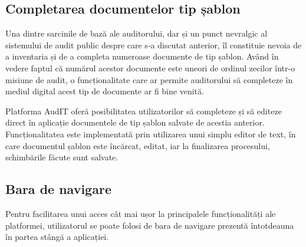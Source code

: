  
 \subsection{Completarea documentelor tip șablon}
 
	Una dintre sarcinile de bază ale auditorului, dar și un punct nevralgic al sistemului de audit public despre care s-a discutat anterior, îl constituie nevoia de a inventaria și de a completa numeroase documente de tip șablon. Având în vedere faptul că numărul acestor documente este uneori de ordinul zecilor într-o misiune de audit, o funcționalitate care ar permite auditorului să completeze în mediul digital acest tip de documente ar fi bine venită.
	
	Platforma AudIT oferă posibilitatea utilizatorilor să completeze și să editeze direct în aplicație documentele de tip șablon salvate de acestia anterior. Funcționalitatea este implementată prin utilizarea unui simplu editor de text, în care documentul șablon este încărcat, editat, iar la finalizarea procesului, schimbările făcute sunt salvate.
	
	\subsection{Bara de navigare}
	Pentru facilitarea unui acces cât mai ușor la principalele funcționalități ale platformei, utilizatorul se poate folosi de bara de navigare prezentă întotdeauna în partea stângă a aplicației.
	
